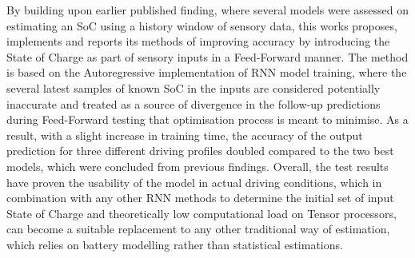 {        By building upon earlier published finding, where several models were assessed on estimating an SoC using a history window of sensory data, this works proposes, implements and reports its methods of improving accuracy by introducing the State of Charge as part of sensory inputs in a Feed-Forward manner.
        The method is based on the Autoregressive implementation of RNN model training, where the several latest samples of known SoC in the inputs are considered potentially inaccurate and treated as a source of divergence in the follow-up predictions during Feed-Forward testing that optimisation process is meant to minimise.
        As a result, with a slight increase in training time, the accuracy of the output prediction for three different driving profiles doubled compared to the two best models, which were concluded from previous findings.
        Overall, the test results have proven the usability of the model in actual driving conditions, which in combination with any other RNN methods to determine the initial set of input State of Charge and theoretically low computational load on Tensor processors, can become a suitable replacement to any other traditional way of estimation, which relies on battery modelling rather than statistical estimations.
}
